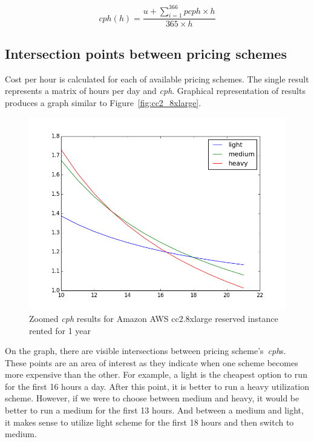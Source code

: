 \documentclass[]{final_report}
\begin{document}
\begin{equation}
\label{eq:cph}
cph(h) = \frac{u + \sum_{i=1}^{366} pcph \times h}{365 \times h}
\end{equation}

\subsection{Intersection points between pricing schemes}

Cost per hour is calculated for each of available pricing schemes. The single result represents a matrix of hours per day and \textit{cph}. Graphical representation of results produces a graph similar to Figure~\ref{fig:cc2_8xlarge}. \par 
\begin{figure}[H]
	\includegraphics[width=\linewidth]{figures/cph_cc2_8xlarge_zoom}
	\caption{Zoomed \textit{cph} results for Amazon AWS cc2.8xlarge reserved instance rented for 1 year~\cite{AWS:light}~\cite{AWS:medium}~\cite{AWS:heavy}}
	\label{fig:cph_cc2_8xlarge_zoom}
\end{figure}

On the graph, there are visible intersections between pricing scheme's~\textit{cph}s. These points are an area of interest as they indicate when one scheme becomes more expensive than the other. For example, a light is the cheapest option to run for the first 16 hours a day. After this point, it is better to run a heavy utilization scheme. However, if we were to choose between medium and heavy, it would be better to run a medium for the first 13 hours. And between a medium and light, it makes sense to utilize light scheme for the first 18 hours and then switch to medium. 
\end{document}
